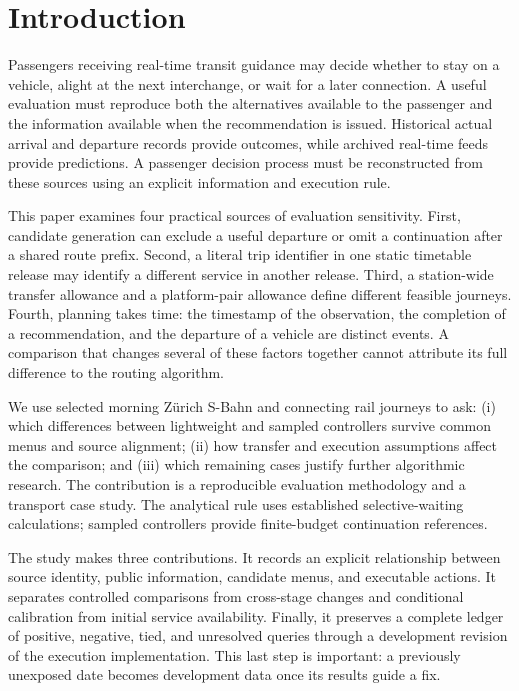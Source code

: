 \documentclass[preprint,12pt,authoryear]{elsarticle}
\begin{document}
\section{Introduction}
Passengers receiving real-time transit guidance may decide whether to stay on a
vehicle, alight at the next interchange, or wait for a later connection. A useful
evaluation must reproduce both the alternatives available to the passenger and
the information available when the recommendation is issued. Historical actual
arrival and departure records provide outcomes, while archived real-time feeds
provide predictions. A passenger decision process must be reconstructed from
these sources using an explicit information and execution rule.

This paper examines four practical sources of evaluation sensitivity. First,
candidate generation can exclude a useful departure or omit a continuation
after a shared route prefix. Second, a literal trip identifier in one static
timetable release may identify a different service in another release. Third,
a station-wide transfer allowance and a platform-pair allowance define different
feasible journeys. Fourth, planning takes time: the timestamp of the observation,
the completion of a recommendation, and the departure of a vehicle are distinct
events. A comparison that changes several of these factors together cannot
attribute its full difference to the routing algorithm.

We use selected morning Z\"urich S-Bahn and connecting rail journeys to ask:
(i) which differences between lightweight and sampled controllers survive common
menus and source alignment; (ii) how transfer and execution assumptions affect
the comparison; and (iii) which remaining cases justify further algorithmic
research. The contribution is a reproducible evaluation methodology and a
transport case study. The analytical rule uses established selective-waiting
calculations; sampled controllers provide finite-budget continuation references.

The study makes three contributions. It records an explicit relationship between
source identity, public information, candidate menus, and executable actions. It
separates controlled comparisons from cross-stage changes and conditional
calibration from initial service availability. Finally, it preserves a complete
ledger of positive, negative, tied, and unresolved queries through a development
revision of the execution implementation. This last step is important: a
previously unexposed date becomes development data once its results guide a fix.
\end{document}
